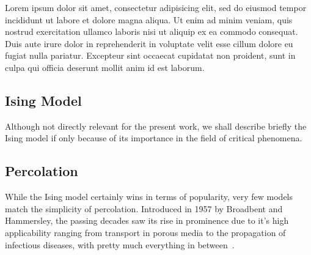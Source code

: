 Lorem ipsum dolor sit amet, consectetur adipisicing elit, sed do eiusmod tempor
incididunt ut labore et dolore magna aliqua. Ut enim ad minim veniam, quis
nostrud exercitation ullamco laboris nisi ut aliquip ex ea commodo consequat.
Duis aute irure dolor in reprehenderit in voluptate velit esse cillum dolore eu
fugiat nulla pariatur. Excepteur sint occaecat cupidatat non proident, sunt in
culpa qui officia deserunt mollit anim id est laborum.

\subsection{Ising Model}
\label{sec:ising}

Although not directly relevant for the present work, we shall describe briefly
the Ising model if only because of its importance in the field of critical
phenomena.


\subsection{Percolation}
\label{sec:perc}

While the Ising model certainly wins in terms of popularity, very few models
match the simplicity of percolation. Introduced in 1957 by Broadbent and
Hammersley, the passing decades saw its rise in prominence due to it's high
applicability ranging from transport in porous media to the propagation of
infectious diseases, with pretty much everything in between~\cite{Araujo2013}.
